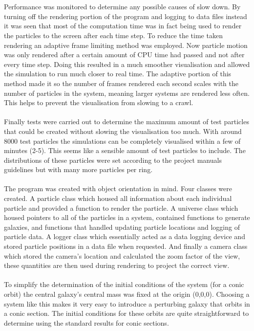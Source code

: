 \documentclass[10pt,a4paper]{article}
\begin{document}
\\
\\
Performance was monitored to determine any possible causes of slow down. By turning off the rendering portion of the program and logging to data files instead it was seen that most of the computation time was in fact being used to render the particles to the screen after each time step. To reduce the time taken rendering an adaptive frame limiting method was employed. Now particle motion was only rendered after a certain amount of CPU time had passed and not after every time step. Doing this resulted in a much smoother visualisation and allowed the simulation to run much closer to real time. The adaptive portion of this method made it so the number of frames rendered each second scales with the number of particles in the system, meaning larger systems are rendered less often. This helps to prevent the visualisation from slowing to a crawl.
\\
\\
Finally tests were carried out to determine the maximum amount of test particles that could be created without slowing the visualisation too much. With around 8000 test particles the simulations can be completely visualised within a few of minutes (2-5). This seems like a sensible amount of test particles to include. The distributions of these particles were set according to the project manuals guidelines but with many more particles per ring.
\\
\\
The program was created with object orientation in mind. Four classes were created. A particle class which housed all information about each individual particle and provided a function to render the particle. A universe class which housed pointers to all of the particles in a system, contained functions to generate galaxies, and functions that handled updating particle locations and logging of particle data. A logger class which essentially acted as a data logging device and stored particle positions in a data file when requested. And finally a camera class which stored the camera's location and calculated the zoom factor of the view, these quantities are then used during rendering to project the correct view.
\\
\\
To simplify the determination of the initial conditions of the system (for a conic orbit) the central galaxy's central mass was fixed at the origin (0,0,0). Choosing a system like this makes it very easy to introduce a perturbing galaxy that orbits in a conic section. The initial conditions for these orbits are quite straightforward to determine using the standard results for conic sections.
\end{document}

